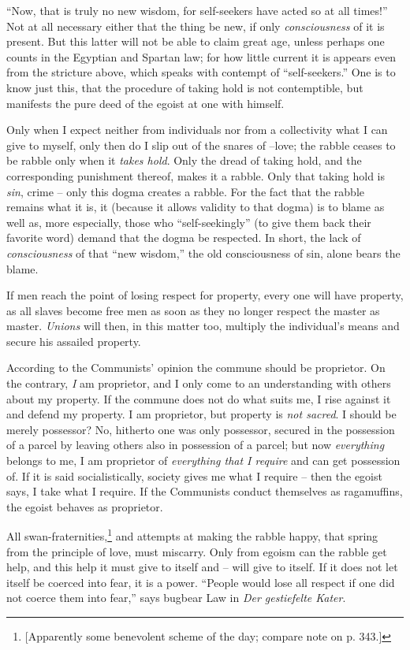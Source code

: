 ``Now, that is truly no new wisdom, for self-seekers have acted so at all 
times!'' Not at all necessary either that the thing be new, if only 
\textit{consciousness} of it is present. But this latter will not be able to 
claim great age, unless perhaps one counts in the Egyptian and Spartan law; 
for how little current it is appears even from the stricture above, which 
speaks with contempt of ``self-seekers.'' One is to know just this, that the 
procedure of taking hold is not contemptible, but manifests the pure deed of 
the egoist at one with himself.

Only when I expect neither from individuals nor from a collectivity what I can 
give to myself, only then do I slip out of the snares of --love; the rabble 
ceases to be rabble only when it \textit{takes hold}. Only the dread of taking 
hold, and the corresponding punishment thereof, makes it a rabble. Only that 
taking hold is \textit{sin}, crime -- only this dogma creates a rabble. For 
the fact that the rabble remains what it is, it (because it allows validity to 
that dogma) is to blame as well as, more especially, those who 
``self-seekingly'' (to give them back their favorite word) demand that the 
dogma be respected. In short, the lack of \textit{consciousness} of that 
``new wisdom,'' the old consciousness of sin, alone bears the blame.

If men reach the point of losing respect for property, every one will have 
property, as all slaves become free men as soon as they no longer respect the 
master as master. \textit{Unions} will then, in this matter too, multiply the 
individual's means and secure his assailed property.

According to the Communists' opinion the commune should be proprietor. On the 
contrary, \textit{I} am proprietor, and I only come to an understanding with 
others about my property. If the commune does not do what suits me, I rise 
against it and defend my property. I am proprietor, but property is 
\textit{not sacred}. I should be merely possessor? No, hitherto one was only 
possessor, secured in the possession of a parcel by leaving others also in 
possession of a parcel; but now \textit{everything} belongs to me, I am 
proprietor of \textit{everything that I require} and can get possession of. If 
it is said socialistically, society gives me what I require -- then the egoist 
says, I take what I require. If the Communists conduct themselves as 
ragamuffins, the egoist behaves as proprietor.

All swan-fraternities,\footnote{[Apparently some benevolent scheme of the day; 
compare note on p. 343.]} and attempts at making the rabble happy, that spring 
from the principle of love, must miscarry. Only from egoism can the rabble get 
help, and this help it must give to itself and -- will give to itself. If it 
does not let itself be coerced into fear, it is a power. ``People would lose 
all respect if one did not coerce them into fear,'' says bugbear Law in 
\textit{Der gestiefelte Kater}.

